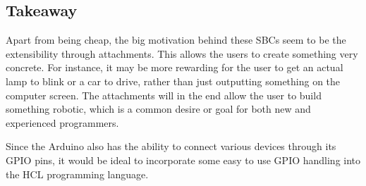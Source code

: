 \subsection{Takeaway}
Apart from being cheap, the big motivation behind these SBCs seem to be the extensibility through attachments. 
This allows the users to create something very concrete. 
For instance, it may be more rewarding for the user to get an actual lamp to blink or a car to drive, rather than just outputting something on the computer screen. 
The attachments will in the end allow the user to build something robotic, which is a common desire or goal for both new and experienced programmers.\cite{EducationalRobotics}

Since the Arduino also has the ability to connect various devices through its GPIO pins, it would be ideal to incorporate some easy to use GPIO handling into the HCL programming language.
